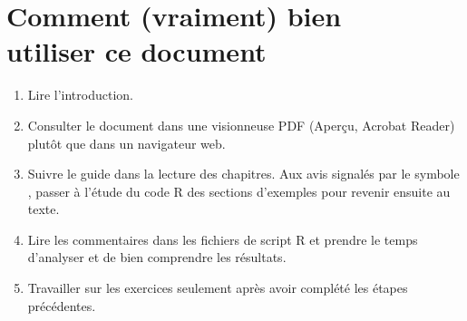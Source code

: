 \chapter*{Comment (vraiment) bien \\ utiliser ce document}

\begin{enumerate}
\item Lire l'introduction.
\item Consulter le document dans une visionneuse PDF (Aperçu, Acrobat
  Reader) plutôt que dans un navigateur web.
\item Suivre le guide dans la lecture des chapitres. Aux avis signalés
  par le symbole {\faMapSigns}, passer à l'étude du code R des
  sections d'exemples pour revenir ensuite au texte.
\item Lire les commentaires dans les fichiers de script R et prendre
  le temps d'analyser et de bien comprendre les résultats.
\item Travailler sur les exercices seulement après avoir complété les
  étapes précédentes.
\end{enumerate}

